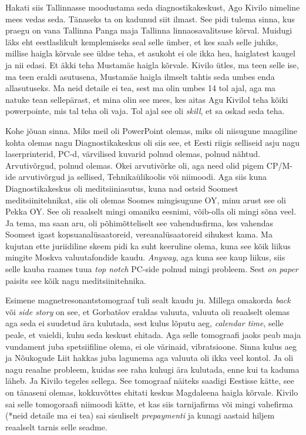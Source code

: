 Hakati siis Tallinnasse moodustama seda diagnostikakeskust, Ago Kivilo nimeline mees vedas seda. Tänaseks ta on kadunud siit ilmast. See pidi tulema sinna, kus praegu on vana Tallinna Panga maja Tallinna linnaosavalitsuse kõrval. Muidugi läks eht eestlaslikult kemplemiseks seal selle ümber, et kes saab selle juhiks, millise haigla kõrvale see üldse teha, et asukoht ei ole ikka hea, haiglatest kaugel ja nii edasi. Et äkki teha Mustamäe haigla kõrvale. Kivilo ütles, ma teen selle ise, ma teen eraldi asutusena, Mustamäe haigla ilmselt tahtis seda umbes enda allasutuseks. Ma neid detaile ei tea, sest ma olin umbes 14 tol ajal, aga ma natuke tean sellepärast, et mina olin see mees, kes aitas Agu Kivilol teha kõiki powerpointe, mis tal teha oli vaja. Tol ajal see oli \emph{skill}, et sa oskad seda teha. 


Kohe jõuan sinna. Miks meil oli PowerPoint olemas, miks oli niisugune maagiline kohta olemas nagu Diagnostikakeskus oli siis see, et Eesti riigis selliseid asju nagu laserprinterid, PC-d, värvilised kuvarid polnud olemas, polnud nähtud. Arvutivõrgud, polnud olemas. Okei arvutivõrke oli, aga need olid pigem CP/M-ide arvutivõrgud ja sellised, Tehnikaülikoolis või niimoodi. Aga siis kuna Diagnostikakeskus oli meditsiiniasutus, kuna nad ostsid Soomest meditsiinitehnikat, siis oli olemas Soomes mingisugune OY, minu arust see oli Pekka OY. See oli reaalselt mingi omaniku eesnimi,  võib-olla oli mingi sõna veel. Ja tema, ma saan aru, oli põhimõtteliselt see vahendusfirma, kes vahendas Soomest igast kopsuanalüsaatoreid, vereanalüsaatoreid sihukest kama. Ma kujutan ette juriidiline skeem pidi ka suht keeruline olema, kuna see kõik liikus mingite Moskva valuutafondide kaudu. \emph{Anyway}, aga kuna see kaup liikus, siis selle kauba raames tuua \emph{top notch} PC-side polnud mingi probleem. Sest \emph{on paper} paisits see kõik nagu meditsiinitehnika. 


Esimene magnetresonantstomograaf tuli sealt kaudu ju. Millega omakorda \emph{back} või \emph{side story} on see, et Gorbatšov eraldas valuuta, valuuta oli reaalselt olemas aga seda ei suudetud ära kulutada, sest kulus lõputu aeg, \emph{calendar time}, selle peale, et vaieldi, kuhu seda keskust ehitada. Aga selle tomograafi jaoks peab maja vundament juba spetsiifiline olema, ei ole värinaid, vibratsioone. Sinna kulus aeg ja Nõukogude Liit hakkas juba lagunema aga valuuta oli ikka veel kontol. Ja  oli nagu reaalne probleem, kuidas see raha kuhugi ära kulutada, enne kui ta kaduma läheb. Ja Kivilo tegeles sellega. See tomograaf näiteks saadigi Eestisse kätte, see on tänaseni olemas, kokkuvõttes ehitati keskus  Magdaleena haigla kõrvale. Kivilo sai selle tomogoraafi niimoodi kätte, et kas siis  tarnijafirma või mingi vahefirma (*neid detaile ma ei tea) sai sisuliselt \emph{prepaymenti} ja kunagi aastaid hiljem reaalselt tarnis selle seadme. 

